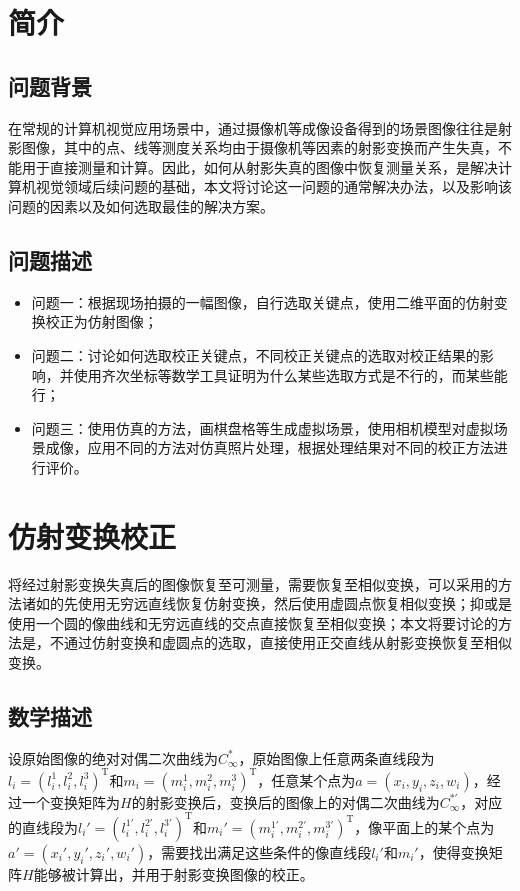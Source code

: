 \documentclass[11pt]{article}
\begin{document}
\newpage

\setcounter{tocdepth}{3}
\tableofcontents
\newpage

\setcounter{page}{1}
\section{简介}
\subsection{问题背景}
在常规的计算机视觉应用场景中，通过摄像机等成像设备得到的场景图像往往是射影图像，其中的点、线等测度关系均由于摄像机等因素的射影变换而产生失真，不能用于直接测量和计算。因此，如何从射影失真的图像中恢复测量关系，是解决计算机视觉领域后续问题的基础，本文将讨论这一问题的通常解决办法，以及影响该问题的因素以及如何选取最佳的解决方案。
\subsection{问题描述}
\begin{itemize}
  \item 问题一：根据现场拍摄的一幅图像，自行选取关键点，使用二维平面的仿射变换校正为仿射图像；
  \item 问题二：讨论如何选取校正关键点，不同校正关键点的选取对校正结果的影响，并使用齐次坐标等数学工具证明为什么某些选取方式是不行的，而某些能行；
  \item 问题三：使用仿真的方法，画棋盘格等生成虚拟场景，使用相机模型对虚拟场景成像，应用不同的方法对仿真照片处理，根据处理结果对不同的校正方法进行评价。
\end{itemize}

\section{仿射变换校正}
将经过射影变换失真后的图像恢复至可测量，需要恢复至相似变换，可以采用的方法诸如的先使用无穷远直线恢复仿射变换，然后使用虚圆点恢复相似变换；抑或是使用一个圆的像曲线和无穷远直线的交点直接恢复至相似变换；本文将要讨论的方法是，不通过仿射变换和虚圆点的选取，直接使用正交直线从射影变换恢复至相似变换。
\subsection{数学描述}
设原始图像的绝对对偶二次曲线为$C_\infty^*$，原始图像上任意两条直线段为$l_i=(l_i^1,l_i^2,l_i^3)^\textrm{T}$和$m_i=(m_i^1,m_i^2,m_i^3)^\textrm{T}$，任意某个点为$a=(x_i,y_i,z_i,w_i)$，经过一个变换矩阵为$H$的射影变换后，变换后的图像上的对偶二次曲线为$C_\infty^{*'}$，对应的直线段为$l_i'=(l_i^{1'},l_i^{2'},l_i^{3'})^\textrm{T}$和$m_i'=(m_i^{1'},m_i^{2'},m_i^{3'})^\textrm{T}$，像平面上的某个点为$a'=(x_i',y_i',z_i',w_i')$，需要找出满足这些条件的像直线段$l_i'$和$m_i'$，使得变换矩阵$H$能够被计算出，并用于射影变换图像的校正。
\end{document}

